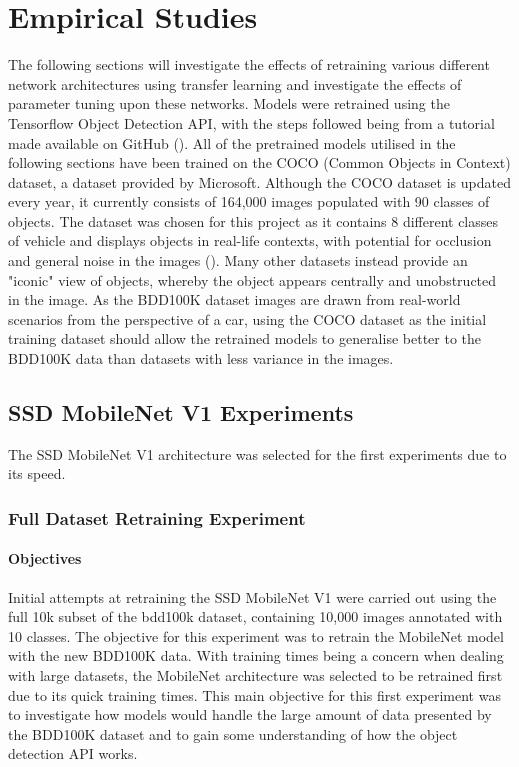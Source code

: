 \documentclass[12pt]{report}
\begin{document}
\chapter{Empirical Studies}
\begin{flushleft}
The following sections will investigate the effects of retraining various different network architectures using transfer learning and investigate the effects of parameter tuning upon these networks. Models were retrained using the Tensorflow Object Detection API, with the steps followed being from a tutorial made available on GitHub (\cite{tutorial}). All of the pretrained models utilised in the following sections have been trained on the COCO (Common Objects in Context) dataset, a dataset provided by Microsoft. Although the COCO dataset is updated every year, it currently consists of 164,000 images populated with 90 classes of objects. The dataset was chosen for this project as it contains 8 different classes of vehicle and displays objects in real-life contexts, with potential for occlusion and general noise in the images (\cite{lin2014microsoft}). Many other datasets instead provide an "iconic" view of objects, whereby the object appears centrally and unobstructed in the image. As the BDD100K dataset images are drawn from real-world scenarios from the perspective of a car, using the COCO dataset as the initial training dataset should allow the retrained models to generalise better to the BDD100K data than datasets with less variance in the images.
\end{flushleft}

\section{SSD MobileNet V1 Experiments}
\begin{flushleft}
The SSD MobileNet V1 architecture was selected for the first experiments due to its speed.
\end{flushleft}

\subsection{Full Dataset Retraining Experiment}
\subsubsection{Objectives}
\begin{flushleft}
Initial attempts at retraining the SSD MobileNet V1 were carried out using the full 10k subset of the bdd100k dataset, containing 10,000 images annotated with 10 classes. The objective for this experiment was to retrain the MobileNet model with the new BDD100K data. With training times being a concern when dealing with large datasets, the MobileNet architecture was selected to be retrained first due to its quick training times. This main objective for this first experiment was to investigate how models would handle the large amount of data presented by the BDD100K dataset and to gain some understanding of how the object detection API works. 
\end{flushleft}
\end{document}

